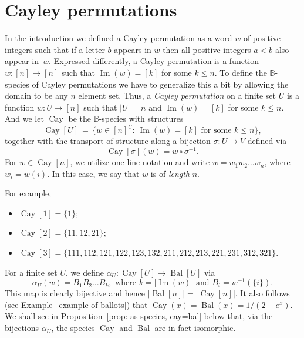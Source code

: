 \documentclass[a4paper, 11pt]{article}
\DeclareMathOperator{\Bal}{Bal}
\DeclareMathOperator{\Cay}{Cay}
\DeclareMathOperator{\Img}{Im}
\newcommand{\BB}{\mathbb{B}}
\theoremstyle{definition}
\begin{document}
\section{Cayley permutations}\label{sec:cayleyperms}

In the introduction we defined a Cayley permutation as a word $w$ of
positive integers such that if a letter $b$ appears in $w$ then all
positive integers $a<b$ also appear in~$w$. Expressed differently, a Cayley
permutation is a function $w:[n]\to [n]$ such that $\Img(w) = [k]$ for
some $k\leq n$. To define the $\BB$-species of Cayley permutations we
have to generalize this a bit by allowing the domain to be any $n$ element
set. Thus, a
\emph{Cayley permutation} on a finite set $U$ is a function
$w: U \rightarrow [n]$ such that $|U| = n$ and $\Img(w) = [k]$ for some $k \leq n$.
And we let $\Cay$ be the $\BB$-species with structures
\[ 
\Cay[U] \,=\,
  \bigl\{
    w\in [n]^U \!:\, \Img(w) = [k] \text{ for some } k \leq n
  \bigr\},
\]
together with the transport of structure along a bijection
$\sigma: U \to V$ defined via 
\[
\Cay[\sigma](w)=w \circ \sigma^{-1}.
\]
For $w \in \Cay[n]$, we utilize one-line notation and write
$w = w_1w_2\ldots w_n$, where $w_i = w(i)$. In this case, we say that $w$ is of
\emph{length} $n$. 

For example,
\begin{itemize}
\item $\Cay[1] = \{1\}$;
\item $\Cay[2] = \{11, 12, 21\}$;
\item $\Cay[3] = \{111, 112, 121, 122, 123, 132, 211, 212, 213, 221, 231, 312, 321\}$.
\end{itemize}

For a finite set $U$, we define
$\alpha_U: \Cay[U] \to \Bal[U]$ via
\[
  \alpha_U(w) = B_1B_2\ldots B_k,
  \text{ where } k=|\Img(w)| \text{ and } B_i = w^{-1}(\{i\}).
\]
This map is clearly bijective and hence
$|\Bal[n]| = |\Cay[n]|$. It also follows
(see Example~\ref{example of ballots}) that
$\Cay(x) = \Bal(x) = 1/(2-e^x)$. We shall see in
Proposition~\ref{prop: as species, cay=bal} below that, via the bijections
$\alpha_U$, the species $\Cay$ and $\Bal$ are in fact isomorphic.
\end{document}
